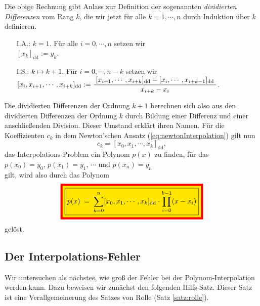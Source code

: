 Die obige Rechnung gibt Anlass zur Definition der sogenannten 
\emph{dividierten Differenzen} vom Rang $k$, die wir jetzt f\"ur alle $k= 1,\cdots,n$ durch
Induktion \"uber  $k$ definieren.  
\begin{enumerate}
\item[I.A.:] $k=1$.  F\"ur alle $i=0,\cdots,n$ setzen wir 
             \\[0.2cm]
             \hspace*{1.3cm}
             $[x_k]_{\mathrm{dd}} := y_k$.
\item[I.S.:] $k\mapsto k+1$. F\"ur $i=0,\cdots,n-k$ setzen wir 
             \\[0.2cm]
             \hspace*{1.3cm}
             $[x_i,x_{i+1},\cdots,x_{i+k}]_{\mathrm{dd}} := \displaystyle\frac{\;\displaystyle[x_{i+1},\cdots,x_{i+k}]_{\mathrm{dd}} - [x_{i},\cdots,x_{i+k-1}]_{\mathrm{dd}}\;}{\;\displaystyle x_{i+k}-x_i\;}$.
\end{enumerate}
Die dividierten Differenzen der Ordnung $k+1$ berechnen sich also aus den dividierten
Differenzen der Ordnung $k$ durch Bildung einer Differenz und einer anschlie{\ss}enden
Division.  Dieser Umstand erkl\"art ihren Namen.  F\"ur die Koeffizienten $c_k$ in dem
Newton'schen Ansatz (\ref{eq:newtonInterpolation}) gilt nun 
\begin{equation}
  \label{eq:newtonInterpolationCk}
  c_k = [x_0,x_1,\cdots,x_k]_{\mathrm{dd}},
\end{equation}
das Interpolations-Problem ein Polynom $p(x)$ zu finden, f\"ur das
\\[0.2cm]
\hspace*{1.3cm}
$p(x_0) = y_0$, \quad
$p(x_1) = y_1$, \quad $\cdots$ \quad und \quad
$p(x_n) = y_n$
\\[0.2cm]
gilt, wird also durch das Polynom
\begin{equation}
  \label{eq:newtonInterpolationFinal}
\colorbox{red}{\colorbox{orange}{\framebox{$\ds p(x) \; = \; \sum\limits_{k=0}^n [x_0,x_1,\cdots,x_k]_{\mathrm{dd}} \cdot  \prod\limits_{i=0}^{k-1}(x-x_i)$}}}
\end{equation}
gel\"ost.
\subsection{Der Interpolations-Fehler}
Wir untersuchen als n\"achstes, wie gro{\ss} der Fehler bei der Polynom-Interpolation werden
kann.  Dazu beweisen wir zun\"achst den folgenden Hilfs-Satz.  Dieser Satz ist eine Verallgemeinerung
des Satzes von Rolle (Satz \ref{satz:rolle}). 

